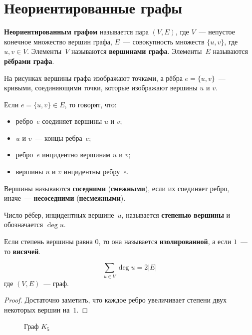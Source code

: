 \section{Неориентированные графы}
 \textbf{Неориентированным графом} называется пара $(V, E)$, где $V$~--- непустое конечное множество вершин графа, $E$~--- совокупность множеств $\{ u, v \}$, где $u, v \in V$.
Элементы~$V$ называются \textbf{вершинами графа}.
Элементы~$E$ называются \textbf{рёбрами графа}.

На рисунках вершины графа изображают точками, а рёбра $e = \{ u, v \}$~--- кривыми, соединяющими точки, которые изображают вершины $u$ и $v$.

Если $e = \{ u, v \} \in E$, то говорят, что:
\begin{itemize}
	\item ребро~$e$ соединяет вершины $u$ и $v$;
	\item $u$ и $v$~--- концы ребра~$e$;
	\item ребро~$e$ инцидентно вершинам $u$ и $v$;
	\item вершины $u$ и $v$ инцидентны ребру~$e$.
\end{itemize}

Вершины называются \textbf{соседними} (\textbf{смежными}), если их соединяет ребро, иначе~--- \textbf{несоседними} (\textbf{несмежными}).

 Число рёбер, инцидентных вершине~$u$, называется \textbf{степенью вершины} и обозначается $\deg u$.

Если степень вершины равна $0$, то она называется \textbf{изолированной}, а если $1$~--- то \textbf{висячей}.

\begin{lemma}[о~рукопожатиях]
\begin{equation*}
\sum_{u \in V} \deg u = 2|E|
\end{equation*}
где $(V, E)$~--- граф.
\end{lemma}
\begin{proof}
Достаточно заметить, что каждое ребро увеличивает степени двух некоторых вершин на~$1$.
\end{proof}

\begin{wrapfigure}{r}{0pt}
\noindent
{}
\caption{Граф $K_5$}
\end{wrapfigure}

